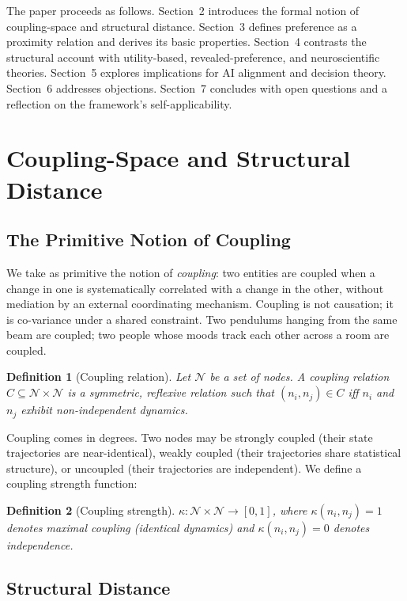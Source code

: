 \documentclass[12pt,a4paper]{article}
\newtheorem{definition}{Definition}[section]
\begin{document}
The paper proceeds as follows. Section~2 introduces the formal notion of coupling-space and structural distance. Section~3 defines preference as a proximity relation and derives its basic properties. Section~4 contrasts the structural account with utility-based, revealed-preference, and neuroscientific theories. Section~5 explores implications for AI alignment and decision theory. Section~6 addresses objections. Section~7 concludes with open questions and a reflection on the framework's self-applicability.

\section{Coupling-Space and Structural Distance}

\subsection{The Primitive Notion of Coupling}

We take as primitive the notion of \emph{coupling}: two entities are coupled when a change in one is systematically correlated with a change in the other, without mediation by an external coordinating mechanism. Coupling is not causation; it is co-variance under a shared constraint. Two pendulums hanging from the same beam are coupled; two people whose moods track each other across a room are coupled.

\begin{definition}[Coupling relation]
Let $\mathcal{N}$ be a set of nodes. A coupling relation $C \subseteq \mathcal{N} \times \mathcal{N}$ is a symmetric, reflexive relation such that $(n_i, n_j) \in C$ iff $n_i$ and $n_j$ exhibit non-independent dynamics.
\end{definition}

Coupling comes in degrees. Two nodes may be strongly coupled (their state trajectories are near-identical), weakly coupled (their trajectories share statistical structure), or uncoupled (their trajectories are independent). We define a coupling strength function:

\begin{definition}[Coupling strength]
$\kappa: \mathcal{N} \times \mathcal{N} \to [0,1]$, where $\kappa(n_i,n_j)=1$ denotes maximal coupling (identical dynamics) and $\kappa(n_i,n_j)=0$ denotes independence.
\end{definition}

\subsection{Structural Distance}
\end{document}
